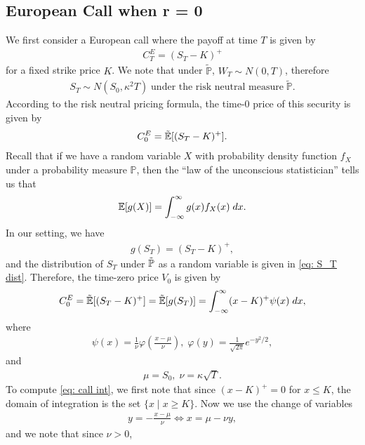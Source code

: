 \documentclass[reqno]{amsart}
\begin{document}
\subsection{European Call when r = 0}
We first consider a European call where the payoff at time $T$ is given by 
\begin{align}
	 C^E_T = (S_T - K)^+
\end{align}
for a fixed strike price $K$. We note that under $\tilde{\mathbb{P}}$, $ W_T \sim N(0, T)$, therefore
\begin{align}\label{eq: S_T dist}
S_T \sim N(S_0, \kappa^2T) \; \text{under the risk neutral measure} \; \tilde{\mathbb{P}}.
\end{align}
According to the risk neutral pricing formula, the time-0 price of this security is given by 
\begin{align}
	 C^E_0 = \tilde{\mathbb{E}}[(S_T - K)^+].
\end{align}
Recall that if we have a random variable $X$ with probability density function $f_X$ under a probability measure $\mathbb{P}$, then the ``law of the unconscious statistician'' tells us that 
\begin{align}
	 \mathbb{E}[g(X)] = \int_{-\infty}^\infty g(x) f_X(x) \; dx.
\end{align}
In our setting, we have 
\begin{align}
	 g(S_T) = (S_T - K)^+,
\end{align}
and the distribution of $S_T$ under $\tilde{\mathbb{P}}$ as a random variable is given in \eqref{eq: S_T dist}. Therefore, the time-zero price $V_0$ is given by 
\begin{align}\label{eq: call int}
	 C^E_0 = \tilde{\mathbb{E}}[(S_T - K)^+] =  \tilde{\mathbb{E}}[g(S_T)] = \int_{-\infty}^\infty (x-K)^+ \psi(x) \; dx,
\end{align}
where 
\begin{align}
	 \psi(x) = \frac{1}{\nu}\varphi\left(\frac{x-\mu}{\nu}\right), \; \varphi(y) = \frac{1}{\sqrt{2\pi}}e^{-y^2/2}, 
\end{align}
and
\begin{align}
	 \mu = S_0, \; \nu = \kappa \sqrt{T}.
\end{align}
To compute \eqref{eq: call int}, we first note that since $(x-K)^+ = 0$ for $x \le K$, the domain of integration is the set $\{x \mid x \ge K\}$. Now we use the change of variables 
\begin{align}
	 y = -\frac{x-\mu}{\nu} \Longleftrightarrow x = \mu - \nu y,
\end{align}
and we note that since $\nu > 0$, 
\end{document}
